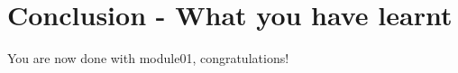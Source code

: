 \documentclass{42-en}
\begin{document}

\newpage

\newpage

\newpage

\newpage

\newpage

\newpage

\newpage
\chapter{Conclusion - What you have learnt}

You are now done with module01, congratulations!
\end{document}

